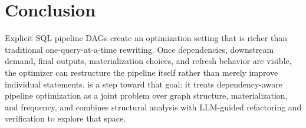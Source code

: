 \section{Conclusion}
\label{sec:conclusion}

Explicit SQL pipeline DAGs create an optimization setting that is richer than traditional one-query-at-a-time rewriting. Once dependencies, downstream demand, final outputs, materialization choices, and refresh behavior are visible, the optimizer can restructure the pipeline itself rather than merely improve individual statements. \tool is a step toward that goal: it treats dependency-aware pipeline optimization as a joint problem over graph structure, materialization, and frequency, and combines structural analysis with LLM-guided refactoring and verification to explore that space.

